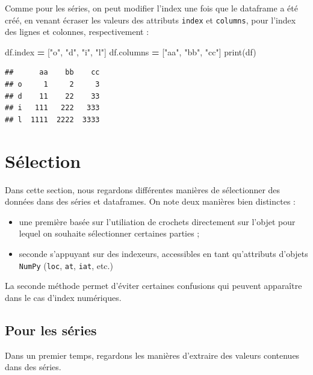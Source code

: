 \documentclass[
  12pt,
]{book}
\newenvironment{Shaded}{\begin{snugshade}}{\end{snugshade}}
\newcommand{\BuiltInTok}[1]{#1}
\newcommand{\NormalTok}[1]{#1}
\newcommand{\OperatorTok}[1]{\textcolor[rgb]{0.81,0.36,0.00}{\textbf{#1}}}
\newcommand{\StringTok}[1]{\textcolor[rgb]{0.31,0.60,0.02}{#1}}
\providecommand{\tightlist}{%
  \setlength{\itemsep}{0pt}\setlength{\parskip}{0pt}}
\numberwithin{equation}{section}
\numberwithin{countremarque}{section}
\begin{document}
Comme pour les séries, on peut modifier l'index une fois que le dataframe a été créé, en venant écraser les valeurs des attributs \texttt{index} et \texttt{columns}, pour l'index des lignes et colonnes, respectivement :

\begin{Shaded}
\begin{Highlighting}[]
\NormalTok{df.index }\OperatorTok{=}\NormalTok{ [}\StringTok{"o"}\NormalTok{, }\StringTok{"d"}\NormalTok{, }\StringTok{"i"}\NormalTok{, }\StringTok{"l"}\NormalTok{]}
\NormalTok{df.columns }\OperatorTok{=}\NormalTok{ [}\StringTok{"aa"}\NormalTok{, }\StringTok{"bb"}\NormalTok{, }\StringTok{"cc"}\NormalTok{]}
\BuiltInTok{print}\NormalTok{(df)}
\end{Highlighting}
\end{Shaded}

\begin{lstlisting}
##      aa    bb    cc
## o     1     2     3
## d    11    22    33
## i   111   222   333
## l  1111  2222  3333
\end{lstlisting}

\section{Sélection}\label{pandas-selection}

Dans cette section, nous regardons différentes manières de sélectionner des données dans des séries et dataframes. On note deux manières bien distinctes :

\begin{itemize}
\tightlist
\item
  une première basée sur l'utiliation de crochets directement sur l'objet pour lequel on souhaite sélectionner certaines parties ;
\item
  seconde s'appuyant sur des indexeurs, accessibles en tant qu'attributs d'objets \texttt{NumPy} (\texttt{loc}, \texttt{at}, \texttt{iat}, etc.)
\end{itemize}

La seconde méthode permet d'éviter certaines confusions qui peuvent apparaître dans le cas d'index numériques.

\subsection{Pour les séries}\label{pour-les-suxe9ries}

Dans un premier temps, regardons les manières d'extraire des valeurs contenues dans des séries.
\end{document}
